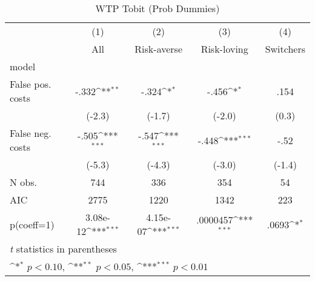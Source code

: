 \begin{table}[htbp]\centering
\def\sym#1{\ifmmode^{#1}\else\(^{#1}\)\fi}
\caption{WTP Tobit (Prob Dummies)}
\begin{tabular}{l*{4}{c}}
\hline\hline
                &\multicolumn{1}{c}{(1)}&\multicolumn{1}{c}{(2)}&\multicolumn{1}{c}{(3)}&\multicolumn{1}{c}{(4)}\\
                &\multicolumn{1}{c}{All}&\multicolumn{1}{c}{Risk-averse}&\multicolumn{1}{c}{Risk-loving}&\multicolumn{1}{c}{Switchers}\\
\hline
model           &                  &                  &                  &                  \\
False pos. costs&    -.332\sym{**} &    -.324\sym{*}  &    -.456\sym{*}  &     .154         \\
                &   (-2.3)         &   (-1.7)         &   (-2.0)         &    (0.3)         \\
False neg. costs&    -.505\sym{***}&    -.547\sym{***}&    -.448\sym{***}&     -.52         \\
                &   (-5.3)         &   (-4.3)         &   (-3.0)         &   (-1.4)         \\
\hline
N obs.          &      744         &      336         &      354         &       54         \\
AIC             &     2775         &     1220         &     1342         &      223         \\
p(coeff=1)      & 3.08e-12\sym{***}& 4.15e-07\sym{***}& .0000457\sym{***}&    .0693\sym{*}  \\
\hline\hline
\multicolumn{5}{l}{\footnotesize \textit{t} statistics in parentheses}\\
\multicolumn{5}{l}{\footnotesize \sym{*} \(p<0.10\), \sym{**} \(p<0.05\), \sym{***} \(p<0.01\)}\\
\end{tabular}
\end{table}
